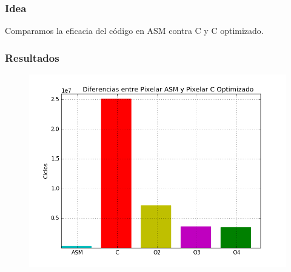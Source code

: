 \subsubsection{Idea}	
	Comparamos la eficacia del código en ASM contra C y C optimizado.
	
\subsubsection{Resultados}
	\begin{figure}[h!]
	\includegraphics[width = 15 cm, height = 10 cm]{imagenes/ASMvsCPixelar.png}
\end{figure}